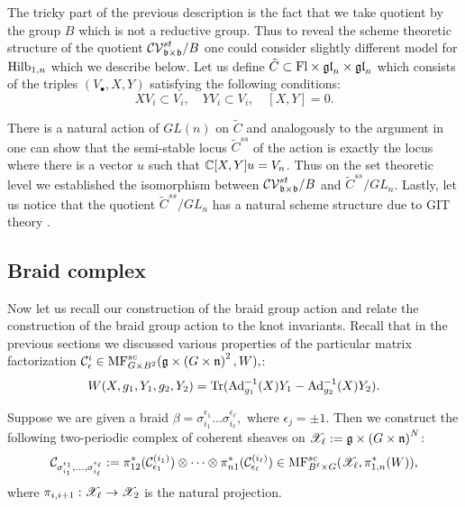 The tricky part of the previous description is the fact that we take quotient by the group $B$ which is not a reductive group.
Thus to reveal the scheme theoretic structure of the quotient $\mathcal{CV}^{st}_{\mathfrak{b}\times \mathfrak{b}}/B$ one could consider slightly different model for $\mathrm{Hilb}_{1,n}$ which we describe below.
Let us define $\tilde{C}\subset \mathrm{Fl}\times \mathfrak{gl}_n\times \mathfrak{gl}_n$ which consists of the triples $(V_{\bullet},X,Y)$ satisfying the following conditions:
$$ X V_i\subset V_i,\quad YV_i\subset V_i, \quad [X,Y]=0.$$

There is a natural action of $GL(n)$ on $\tilde{C}$ and
analogously to the argument in \cite{Nak} one can show that the semi-stable locus $\tilde{C}^{ss}$ of the action is exactly the locus where there is a vector $u$ such that $\mathbb{C}[X,Y]u=V_n$.
Thus on the set theoretic level we established the isomorphism between $\mathcal{CV}^{st}_{\mathfrak{b}\times\mathfrak{b}}/B$ and $\tilde{C}^{ss}/GL_n$. Lastly, let us notice that the quotient $\tilde{C}^{ss}/GL_n$ has a natural
scheme structure due to GIT theory \cite{N}.

\subsection{Braid complex}\label{ssec: Cb} Now let us recall our construction of the braid group action and relate the construction of the braid group action to the knot invariants. Recall that in the previous sections we discussed
various properties of the particular matrix factorization
\( \mathcal{C}_\epsilon^i\in \mathrm{MF}^{sc}_{G\times B^2}(\mathfrak{g}\times \left( G\times \mathfrak{n}\right)^2,W), \):
\[ W(X,g_1,Y_1,g_2,Y_2)=\mathop{{\rm Tr}}\nolimits({\rm Ad}^{-1}_{g_1}(X)Y_1-{\rm Ad}^{-1}_{g_2}(X)Y_2).\]

Suppose we are given a braid $\beta=\sigma_{i_1}^{\epsilon_1}\dots \sigma_{i_\ell}^{\epsilon_\ell},$  where $\epsilon_j=\pm 1$. Then we construct the following two-periodic complex of coherent sheaves on
$\mathscr{X}_\ell:=\mathfrak{g}\times \left( G\times \mathfrak{n} \right)^N$:
$$\mathcal{C}_{\sigma_{i_1}^{\epsilon_1},\dots,\sigma_{i_\ell}^{\epsilon_\ell}}:=\pi_{12}^*(\mathcal{C}^{(i_1)}_{\epsilon_1})\otimes\dots\otimes\pi_{n1}^*(\mathcal{C}^{(i_\ell)}_{\epsilon_\ell})\in \mathrm{MF}^{sc}_{B^\ell\times G}(\mathscr{X}_\ell,\pi_{1,n}^*(W)),$$
where $\pi_{i,i+1}:\mathscr{X}_\ell\to \mathscr{X}_2$ is the natural projection.




